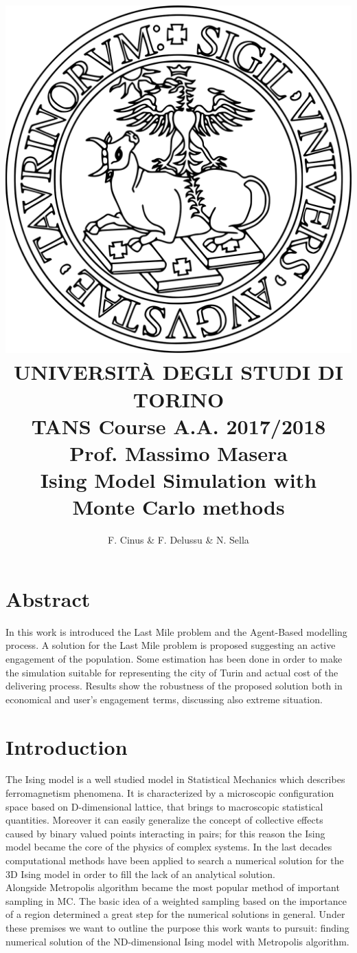 \documentclass[11pt,a4paper]{article}
\author{F. Cinus \& F. Delussu \& N. Sella}
\title{\includegraphics[scale=0.12]{Unito-logo} \\ \LARGE{UNIVERSIT\`{A} DEGLI STUDI DI TORINO}
  \\
  TANS Course A.A. 2017/2018 Prof. Massimo Masera
  \\
  \textbf{Ising Model Simulation with Monte Carlo methods}
}
\begin{document}
\date{}
\maketitle
\bigskip
\section*{Abstract}
In this work is introduced the Last Mile problem and the Agent-Based modelling process.
A solution for the Last Mile problem is proposed suggesting an active engagement of the population.
Some estimation has been done in order to make the simulation suitable for representing the city of Turin and actual cost of the delivering process.
Results show the robustness of the proposed solution both in economical and user's engagement terms, discussing also extreme situation.

\newpage
\section*{Introduction}
The Ising model is a well studied model in Statistical Mechanics which describes ferromagnetism phenomena. It is characterized by a microscopic configuration space based on D-dimensional lattice, that brings to macroscopic statistical quantities. Moreover it can easily generalize the concept of collective effects caused by binary valued points interacting in pairs; for this reason the Ising model became the core of the physics of complex systems. In the last decades computational methods have been applied to search a numerical solution for the 3D Ising model in order to  fill the lack of an analytical solution.
\\
Alongside Metropolis algorithm became the most popular method of important sampling in MC. The basic idea of a weighted sampling based on the importance of a region determined a great step for the numerical solutions in general. Under these premises we want to outline the purpose this work wants to pursuit: finding numerical solution of the ND-dimensional Ising model with Metropolis algorithm.
\end{document}
